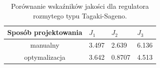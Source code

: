 \begin{table}[h]
	\caption{Porównanie wska\'zników jakości dla regulatora rozmytego typu Tagaki-Sageno.}
	\label{fuzzy_sageno_wsk}
	\centering
	
	\begin{tabular}{|c|M{2.5cm}|M{2.5cm}|M{2.5cm}|}
		\hline
		Sposób projektowania &$J_1$&$J_2$&$J_3$\\
		\hline
		manualny &3.497&  2.639 &  6.136\\
		\hline
		optymalizacja &3.642&  0.8707 &  4.513\\
		\hline		
	\end{tabular}
\end{table}